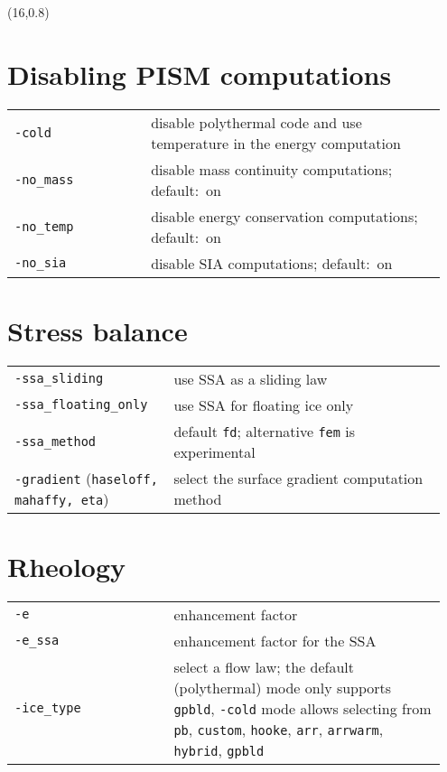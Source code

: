 \documentclass[landscape]{article}
\begin{document}
\begin{textblock}{15}(16,0.8)

\section{Disabling PISM computations}
\label{sec:switches}
\begin{tabular}{@{}p{0.3\linewidth}p{0.65\linewidth}@{}}
\texttt{-cold} & disable polythermal code and use temperature in the energy
computation\\
\texttt{-no_mass} & disable mass continuity computations; \mbox{default: on}\\
\texttt{-no_temp} & disable energy conservation computations; \mbox{default: on}\\
\texttt{-no_sia} & disable SIA computations; \mbox{default: on}
\end{tabular}

\section{Stress balance}
\label{sec:stress-balance}

\begin{tabular}{@{}p{0.35\linewidth}p{0.6\linewidth}@{}}
\texttt{-ssa_sliding} & use SSA as a sliding law\\
\texttt{-ssa_floating_only} & use SSA for floating ice only\\
\texttt{-ssa_method} & default \texttt{fd}; alternative \texttt{fem} is experimental\\
\texttt{-gradient} (\texttt{haseloff, mahaffy, eta})& select the surface
gradient computation method\\
\end{tabular}

\section{Rheology}
\label{sec:rheology}
\begin{tabular}{@{}p{0.35\linewidth}p{0.6\linewidth}@{}}
\texttt{-e} & enhancement factor\\
\texttt{-e_ssa} & enhancement factor for the SSA\\
\texttt{-ice_type} & select a flow law; the default (polythermal) mode only
supports \texttt{gpbld}, \texttt{-cold} mode allows selecting from \texttt{pb},
\texttt{custom}, \texttt{hooke}, \texttt{arr}, \texttt{arrwarm},
\texttt{hybrid}, \texttt{gpbld}\\
\end{tabular}



\end{textblock}
\end{document}
